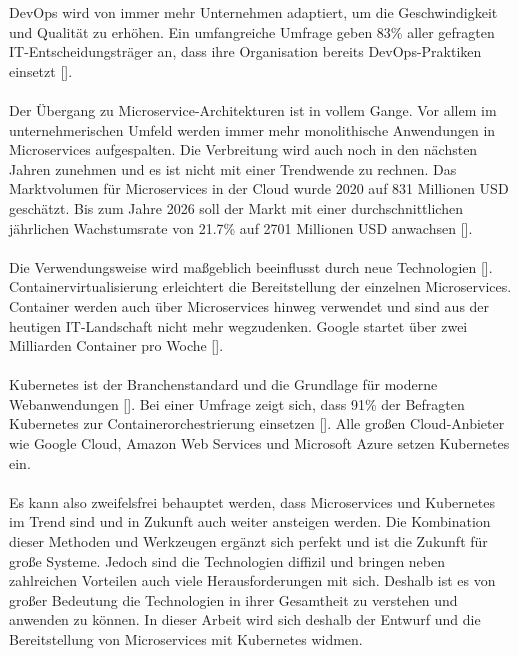 DevOps wird von immer mehr Unternehmen adaptiert, um die Geschwindigkeit und Qualität zu erhöhen. Ein umfangreiche Umfrage geben 83\% aller gefragten IT-Entscheidungsträger an, dass ihre Organisation bereits DevOps-Praktiken einsetzt [\cite[S. 10]{puppetState2021}]. \\
\\
Der Übergang zu Microservice-Architekturen ist in vollem Gange. Vor allem im unternehmerischen Umfeld werden immer mehr monolithische Anwendungen in Microservices aufgespalten. Die Verbreitung wird auch noch in den nächsten Jahren zunehmen und es ist nicht mit einer Trendwende zu rechnen. Das Marktvolumen für Microservices in der Cloud wurde 2020 auf 831 Millionen \ac{USD} geschätzt. Bis zum Jahre 2026 soll der Markt mit einer durchschnittlichen jährlichen Wachstumsrate von 21.7\%  auf 2701 Millionen \ac{USD} anwachsen [\cite[S. 7]{mordorintelligenceGlobal2020}]. \\
\\
Die Verwendungsweise wird maßgeblich beeinflusst durch neue Technologien [\cite[S. 16]{newmanMicroservices2015}]. 
Containervirtualisierung erleichtert die Bereitstellung der einzelnen Microservices. Container werden auch über Microservices hinweg verwendet und sind aus der heutigen IT-Landschaft nicht mehr wegzudenken. Google startet über zwei Milliarden Container pro Woche [\cite[S. 43]{liebelSkalierbare2021}]. \\
\\
Kubernetes ist der Branchenstandard und die Grundlage für moderne Webanwendungen [\cite[Vorwort]{arundelCloud2019}]. Bei einer Umfrage zeigt sich, dass 91\% der Befragten Kubernetes zur Containerorchestrierung einsetzen [\cite[S. 8]{cloudnativecomputingfoundationCloud2020}]. Alle großen Cloud-Anbieter wie Google Cloud, Amazon Web Services und Microsoft Azure setzen Kubernetes ein. \\
\\
Es kann also zweifelsfrei behauptet werden, dass Microservices und Kubernetes im Trend sind und in Zukunft auch weiter ansteigen werden. Die Kombination dieser Methoden und Werkzeugen ergänzt sich perfekt und ist die Zukunft für große Systeme. Jedoch sind die Technologien diffizil und bringen neben zahlreichen Vorteilen auch viele Herausforderungen mit sich. Deshalb ist es von großer Bedeutung die Technologien in ihrer Gesamtheit zu verstehen und anwenden zu können. In dieser Arbeit wird sich deshalb der Entwurf und die Bereitstellung von Microservices mit Kubernetes widmen.

